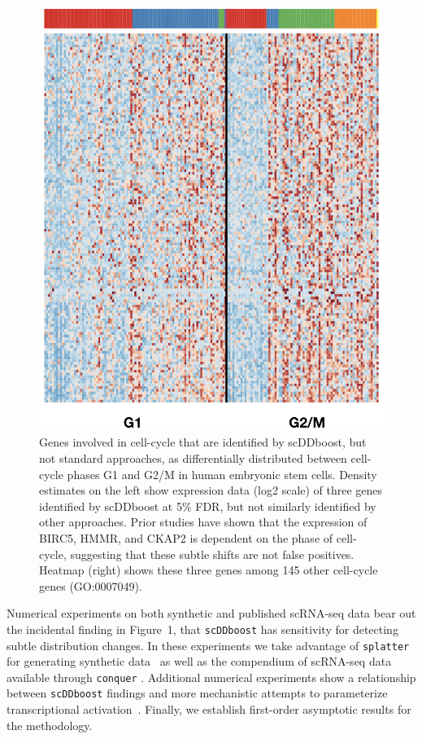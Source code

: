 \documentclass[aoas,preprint]{imsart}
\begin{document}
\begin{figure}[H]
 \includegraphics[clip,width=\textwidth]{Figs/HeatUni.png}
\endminipage

 \caption{Genes involved in cell-cycle that are identified by scDDboost, but not standard approaches,
 as differentially distributed between cell-cycle phases G1 and G2/M in human embryonic stem cells. 
  Density estimates on the left show expression data (log2 scale)
of three genes identified by scDDboost at 5\% FDR, but not similarly identified by other approaches. 
 Prior studies have shown that the expression
 of  BIRC5, HMMR, and CKAP2  is dependent on the phase of cell-cycle,
 suggesting that these subtle shifts are not false positives. 
 Heatmap (right) shows these three genes among 145 other cell-cycle genes (GO:0007049). 
 \label{fig:whet} }
\end{figure}


Numerical experiments  on both synthetic and published scRNA-seq data bear out the incidental finding 
in Figure~1, that \verb+scDDboost+ has sensitivity for detecting subtle distribution changes. 
  In these experiments we take advantage of
\verb+splatter+ for generating synthetic data~\citep{ref:Zappia} as well as the compendium of scRNA-seq
data available through \verb+conquer+ \citep{ref:Cq}.  Additional numerical experiments show a relationship
 between \verb+scDDboost+ findings and more mechanistic attempts to parameterize transcriptional
 activation~\citep{ref:d3e}.  Finally, we establish first-order asymptotic results for the methodology.  
\end{document}

